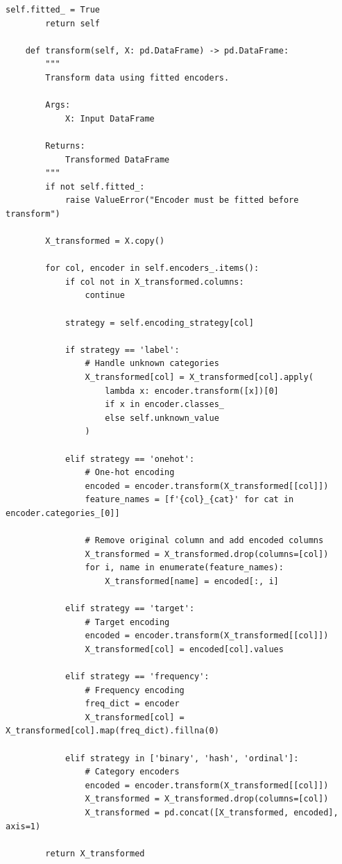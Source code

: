 \begin{lstlisting}[style=python, caption={Comprehensive Categorical Encoding Framework}]
        self.fitted_ = True
        return self

    def transform(self, X: pd.DataFrame) -> pd.DataFrame:
        """
        Transform data using fitted encoders.

        Args:
            X: Input DataFrame

        Returns:
            Transformed DataFrame
        """
        if not self.fitted_:
            raise ValueError("Encoder must be fitted before transform")

        X_transformed = X.copy()

        for col, encoder in self.encoders_.items():
            if col not in X_transformed.columns:
                continue

            strategy = self.encoding_strategy[col]

            if strategy == 'label':
                # Handle unknown categories
                X_transformed[col] = X_transformed[col].apply(
                    lambda x: encoder.transform([x])[0]
                    if x in encoder.classes_
                    else self.unknown_value
                )

            elif strategy == 'onehot':
                # One-hot encoding
                encoded = encoder.transform(X_transformed[[col]])
                feature_names = [f'{col}_{cat}' for cat in encoder.categories_[0]]

                # Remove original column and add encoded columns
                X_transformed = X_transformed.drop(columns=[col])
                for i, name in enumerate(feature_names):
                    X_transformed[name] = encoded[:, i]

            elif strategy == 'target':
                # Target encoding
                encoded = encoder.transform(X_transformed[[col]])
                X_transformed[col] = encoded[col].values

            elif strategy == 'frequency':
                # Frequency encoding
                freq_dict = encoder
                X_transformed[col] = X_transformed[col].map(freq_dict).fillna(0)

            elif strategy in ['binary', 'hash', 'ordinal']:
                # Category encoders
                encoded = encoder.transform(X_transformed[[col]])
                X_transformed = X_transformed.drop(columns=[col])
                X_transformed = pd.concat([X_transformed, encoded], axis=1)

        return X_transformed


\end{lstlisting}
